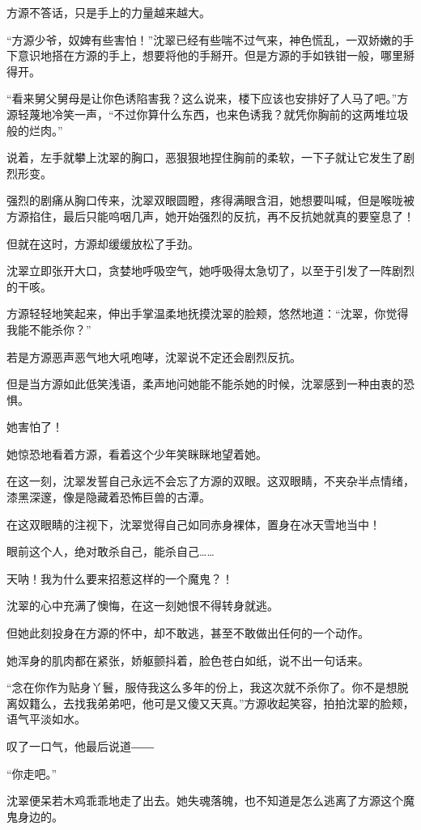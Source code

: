 \begin{this_body}
方源不答话，只是手上的力量越来越大。

“方源少爷，奴婢有些害怕！”沈翠已经有些喘不过气来，神色慌乱，一双娇嫩的手下意识地搭在方源的手上，想要将他的手掰开。但是方源的手如铁钳一般，哪里掰得开。

“看来舅父舅母是让你色诱陷害我？这么说来，楼下应该也安排好了人马了吧。”方源轻蔑地冷笑一声，“不过你算什么东西，也来色诱我？就凭你胸前的这两堆垃圾般的烂肉。”

说着，左手就攀上沈翠的胸口，恶狠狠地捏住胸前的柔软，一下子就让它发生了剧烈形变。

强烈的剧痛从胸口传来，沈翠双眼圆瞪，疼得满眼含泪，她想要叫喊，但是喉咙被方源掐住，最后只能呜咽几声，她开始强烈的反抗，再不反抗她就真的要窒息了！

但就在这时，方源却缓缓放松了手劲。

沈翠立即张开大口，贪婪地呼吸空气，她呼吸得太急切了，以至于引发了一阵剧烈的干咳。

方源轻轻地笑起来，伸出手掌温柔地抚摸沈翠的脸颊，悠然地道：“沈翠，你觉得我能不能杀你？”

若是方源恶声恶气地大吼咆哮，沈翠说不定还会剧烈反抗。

但是当方源如此低笑浅语，柔声地问她能不能杀她的时候，沈翠感到一种由衷的恐惧。

她害怕了！

她惊恐地看着方源，看着这个少年笑眯眯地望着她。

在这一刻，沈翠发誓自己永远不会忘了方源的双眼。这双眼睛，不夹杂半点情绪，漆黑深邃，像是隐藏着恐怖巨兽的古潭。

在这双眼睛的注视下，沈翠觉得自己如同赤身裸体，置身在冰天雪地当中！

眼前这个人，绝对敢杀自己，能杀自己……

天呐！我为什么要来招惹这样的一个魔鬼？！

沈翠的心中充满了懊悔，在这一刻她恨不得转身就逃。

但她此刻投身在方源的怀中，却不敢逃，甚至不敢做出任何的一个动作。

她浑身的肌肉都在紧张，娇躯颤抖着，脸色苍白如纸，说不出一句话来。

“念在你作为贴身丫鬟，服侍我这么多年的份上，我这次就不杀你了。你不是想脱离奴籍么，去找我弟弟吧，他可是又傻又天真。”方源收起笑容，拍拍沈翠的脸颊，语气平淡如水。

叹了一口气，他最后说道――

“你走吧。”

沈翠便呆若木鸡乖乖地走了出去。她失魂落魄，也不知道是怎么逃离了方源这个魔鬼身边的。


\end{this_body}
